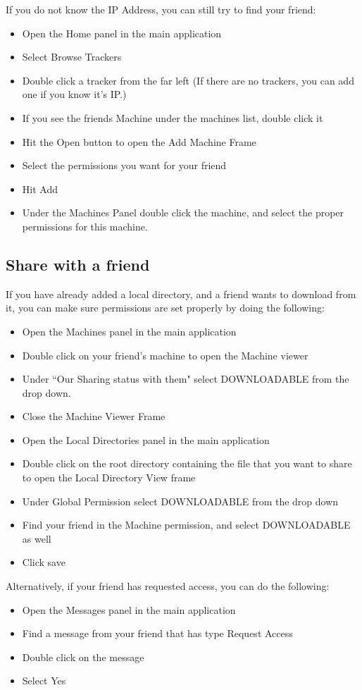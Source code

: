 \documentclass{article}
\begin{document}
If you do not know the IP Address, you can still try to find your friend:
\begin{itemize}
  \item Open the Home panel in the main application
  \item Select Browse Trackers
  \item Double click a tracker from the far left (If there are no trackers, you can add one if you know it's IP.)
  \item If you see the friends Machine under the machines list, double click it
  \item Hit the Open button to open the Add Machine Frame
  \item Select the permissions you want for your friend
  \item Hit Add
  \item Under the Machines Panel double click the machine, and select the proper permissions for this machine.
\end{itemize}

\subsection{Share with a friend}
If you have already added a local directory, and a friend wants to download from it, you can make sure permissions are set properly by doing the following:
\begin{itemize}
  \item Open the Machines panel in the main application
  \item Double click on your friend's machine to open the Machine viewer
  \item Under ``Our Sharing status with them" select DOWNLOADABLE from the drop down.
  \item Close the Machine Viewer Frame
  \item Open the Local Directories panel in the main application
  \item Double click on the root directory containing the file that you want to share to open the Local Directory View frame
  \item Under Global Permission select DOWNLOADABLE from the drop down
  \item Find your friend in the Machine permission, and select DOWNLOADABLE as well
  \item Click save
\end{itemize}

Alternatively, if your friend has requested access, you can do the following:
\begin{itemize}
  \item Open the Messages panel in the main application
  \item Find a message from your friend that has type Request Access
  \item Double click on the message
  \item Select Yes
\end{itemize}
\end{document}
